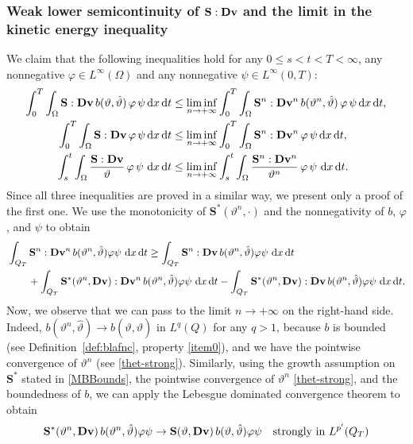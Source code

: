 \documentclass[11pt, a4paper, reqno]{amsart}
\numberwithin{equation}{section}
\newcommand{\thetah}{\hat\thet}
\newcommand{\vc}[1]{{\bf #1}}
\newcommand{\vv}{\vc{v}}
\newcommand{\thet}{\vartheta}
\renewcommand{\S}{\mathbf{S}}
\newcommand{\D}{\mathbf{D}}
\newcommand{\dt}{\,{\rm d} t }
\newcommand{\dx}{\,{\rm d} {x}}
\newcommand{\dxdt}{\dx  \dt}
\newcommand{\intTO}[1]{\int_0^T \int_{\Omega} #1  \dxdt}
\newcommand{\bb}{b}
\begin{document}
\subsubsection{Weak lower semicontinuity of $\S : \D\vv$ and the limit in the kinetic energy inequality}

We claim that the following inequalities hold for any $0 \le s < t < T<\infty$, any nonnegative $\varphi \in L^{\infty}(\Omega)$ and any nonnegative  $\psi \in L^{\infty}(0,T)$:
\begin{align}
\label{eq:wlsc1} 
\intTO{\S : \D\vv \, \bb(\thet, \thetah) \, \varphi \, \psi} 
&\le \liminf_{n \to +\infty} \intTO{\S^{n} : \D\vv^{n} \, \bb(\thet^n, \thetah) \, \varphi \, \psi},\\
\label{eq:wlsc2} 
\intTO{\S : \D\vv \, \varphi\, \psi } 
&\le \liminf_{n \to +\infty} \intTO{\S^{n} : \D\vv^{n}\, \varphi\, \psi},\\
\label{eq:wlsc3} 
\int_s^t \int_\Omega \frac{\S : \D\vv}{\thet} \, \varphi\, \psi\, \dxdt 
&\le \liminf_{n \to +\infty} \int_s^t \int_\Omega \frac{\S^n : \D\vv^n}{\thet^n} \, \varphi\, \psi\, \dxdt.
\end{align}
Since all three inequalities are proved in a similar way, we present only a proof of the first one. We use the monotonicity of $\S^*(\thet^n, \cdot)$ and the nonnegativity of $\bb$, $\varphi$, and $\psi$ to obtain
\begin{equation}
\begin{aligned}\label{eq:221}
  &\int_{Q_T} \S^n : \D\vv^n \, \bb(\thet^n, \thetah) \varphi \psi \, \dxdt
  \ge \int_{Q_T} \S^n : \D\vv \, \bb(\thet^n, \thetah) \varphi \psi \, \dxdt \\
  &\qquad + \int_{Q_T} \S^*(\thet^n, \D\vv) : \D\vv^n \, \bb(\thet^n, \thetah) \varphi \psi \, \dxdt
  - \int_{Q_T} \S^*(\thet^n, \D\vv) : \D\vv \, \bb(\thet^n, \thetah) \varphi \psi \, \dxdt.
\end{aligned}
\end{equation}
Now, we observe that we can pass to the limit $n \to +\infty$ on the right-hand side. Indeed, $\bb(\thet^n, \thetah) \to \bb(\thet, \thetah)$ in $L^q(Q)$ for any $q>1$, because $\bb$ is bounded (see Definition~\ref{def:blafnc}, property \eqref{item0}), and we have the pointwise convergence of $\thet^n$ (see \eqref{thet-strong}). Similarly, using the growth assumption on $\S^*$ stated in \eqref{MBBounds}, the pointwise convergence of $\thet^n$ \eqref{thet-strong}, and the boundedness of $\bb$, we can apply the Lebesgue dominated convergence theorem to obtain
$$
\S^*(\thet^n, \D\vv) \, \bb(\thet^n, \thetah) \varphi \psi 
\to \S(\thet, \D\vv) \, \bb(\thet, \thetah) \varphi \psi \quad \text{strongly in } L^{p'}(Q_T)
$$
\end{document}
